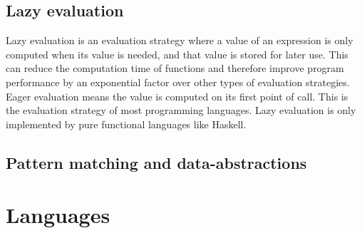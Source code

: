 \subsection{Lazy evaluation}
Lazy evaluation is an evaluation strategy where a value of an expression is only computed when its value is needed, and
that value is stored for later use. This can reduce the computation time of functions and therefore improve program
performance by an exponential factor over other types of evaluation strategies. Eager evaluation means the value is
computed on its first point of call. This is the evaluation strategy of most programming languages. Lazy evaluation is
only implemented by pure functional languages like Haskell.\cite{languagedesign}

\subsection{Pattern matching and data-abstractions}

\section{Languages}

